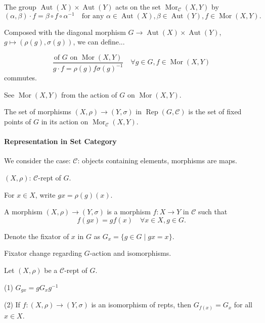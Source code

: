 \documentclass[11pt, a4paper]{report}
\begin{document}
\begin{definition}
The group $\operatorname{Aut}(X) \times \operatorname{Aut}(Y)$ acts on the set $\operatorname{Mor}_{\mathcal{C}}(X, Y)$ by
\[
(\alpha, \beta) \cdot f = \beta \circ f \circ \alpha^{-1} \quad \text{for any } \alpha \in \operatorname{Aut}(X), \beta \in \operatorname{Aut}(Y), f \in \operatorname{Mor}(X, Y).
\]

Composed with the diagonal morphism $G \rightarrow \operatorname{Aut}(X) \times \operatorname{Aut}(Y)$, $g \mapsto (\rho(g), \sigma(g))$, we can define...
\end{definition}
\[
\frac{\text{of } G \text{ on } \operatorname{Mor}(X, Y)}{g \cdot f = \rho(g) f \sigma(g)^{-1}} \quad \forall g \in G, f \in \operatorname{Mor}(X, Y)
\]
commutes.


\begin{lemma}
See $\operatorname{Mor}(X, Y)$ from the action of $G$ on $\operatorname{Mor}(X, Y)$.

The set of morphisms $(X, \rho) \rightarrow (Y, \sigma)$ in $\operatorname{Rep}(G, \mathcal{C})$ is the set of fixed points of $G$ in its action on $\operatorname{Mor}_{\mathcal{C}}(X, Y)$.
\end{lemma}

\paragraph{Representation in Set Category}

We consider the case: $\mathcal{C}$: objects containing elements, morphisms are maps.

$(X, \rho)$: $\mathcal{C}$-rept of $G$.

For $x \in X$, write $gx = \rho(g)(x)$.

A morphism $(X, \rho) \rightarrow (Y, \sigma)$ is a morphism $f: X \rightarrow Y$ in $\mathcal{C}$ such that
\[
f(gx) = gf(x) \quad \forall x \in X, g \in G.
\]

Denote the fixator of $x$ in $G$ as $G_x = \{g \in G \mid gx = x\}$.

\begin{lemma}
Fixator change regarding $G$-action and isomorphisms.

Let $(X, \rho)$ be a $\mathcal{C}$-rept of $G$.

(1) $G_{gx} = gG_x g^{-1}$

(2) If $f: (X, \rho) \rightarrow (Y, \sigma)$ is an isomorphism of repts, then $G_{f(x)} = G_x$ for all $x \in X$.
\end{lemma}
\end{document}
